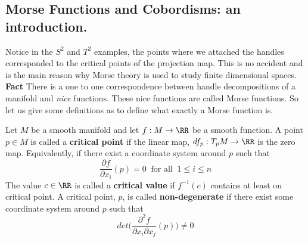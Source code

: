 \subsection{Morse Functions and Cobordisms: an introduction.}
Notice in the $S^{2}$ and $T^{2}$ examples, the points where we attached the handles corresponded to the critical points of the projection map. This is no accident and is the main reason why Morse theory is used to study finite dimensional spaces. \textbf{Fact} There is a one to one correspondence between handle decompositions of a manifold and \textit{nice} functions. These nice functions are called Morse functions. So let us give some definitions as to define what exactly a Morse function is.

\begin{definition}
Let $M$ be a smooth manifold and let $f:M\rightarrow \RR$ be a smooth function. A point $p\in M$ is called a \textbf{critical point} if the linear map, $df_{p}:T_{p}M\rightarrow \RR$ is the zero map. Equivalently, if there exist a coordinate system around $p$ such that 
\[
\frac{\partial f}{\partial x_{i}}(p) =0 ~ \text{ for all }~1\leq i \leq n
\]
The value $c\in \RR$ is called a \textbf{critical value} if $f^{-1}(c)$ contains at least on critical point. A critical point, $p$, is called \textbf{non-degenerate} if there exist some coordinate system around $p$ such that 
\[
det\bigg( \frac{\partial^{2} f}{\partial x_{i}{\partial x_{j}}}(p)\bigg)\neq 0
\]
\end{definition}